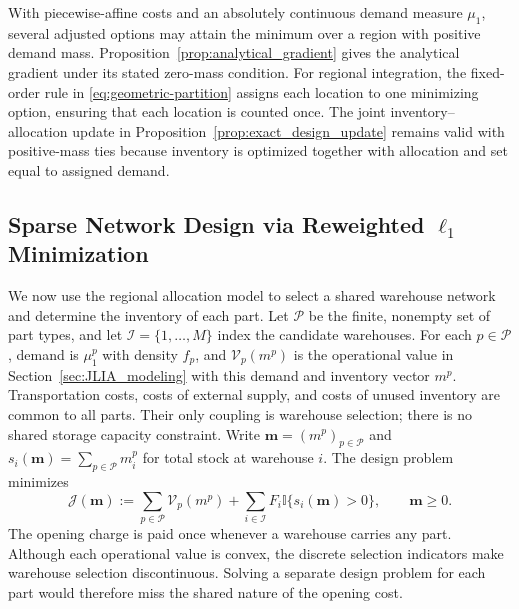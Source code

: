 \documentclass[a4paper,fleqn]{cas-sc}
\theoremstyle{remark}
\theoremstyle{plain}
\begin{document}
With piecewise-affine costs and an absolutely continuous demand measure $\mu_1$, several adjusted options may attain the minimum over a region with positive demand mass. Proposition~\ref{prop:analytical_gradient} gives the analytical gradient under its stated zero-mass condition. For regional integration, the fixed-order rule in \eqref{eq:geometric-partition} assigns each location to one minimizing option, ensuring that each location is counted once. The joint inventory--allocation update in Proposition~\ref{prop:exact_design_update} remains valid with positive-mass ties because inventory is optimized together with allocation and set equal to assigned demand.


\subsection{Sparse Network Design via Reweighted $\ell_1$ Minimization}\label{subsec:sparse_network_design}

We now use the regional allocation model to select a shared warehouse network and determine the inventory of each part. Let $\mathcal P$ be the finite, nonempty set of part types, and let $\mathcal I=\{1,\ldots,M\}$ index the candidate warehouses. For each $p\in\mathcal P$, demand is $\mu_1^p$ with density $f_p$, and $\mathcal V_p(m^p)$ is the operational value in Section~\ref{sec:JLIA_modeling} with this demand and inventory vector $m^p$. Transportation costs, costs of external supply, and costs of unused inventory are common to all parts. Their only coupling is warehouse selection; there is no shared storage capacity constraint. Write $\mathbf m=(m^p)_{p\in\mathcal P}$ and $s_i(\mathbf m)=\sum_{p\in\mathcal P}m_i^p$ for total stock at warehouse $i$. The design problem minimizes
\begin{equation}
    \mathcal J(\mathbf m):=\sum_{p\in\mathcal P}\mathcal V_p(m^p)
        +\sum_{i\in\mathcal I}F_i\mathbb I\{s_i(\mathbf m)>0\},\qquad \mathbf m\ge0.
    \label{eq:design_objective}
\end{equation}
The opening charge is paid once whenever a warehouse carries any part. Although each operational value is convex, the discrete selection indicators make warehouse selection discontinuous. Solving a separate design problem for each part would therefore miss the shared nature of the opening cost.
\end{document}
